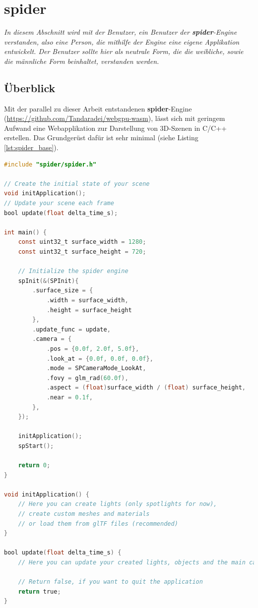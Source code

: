 \documentclass[oneside]{ausarbeitung}
\newcommand*{\quotize}[1]{\glqq #1\grqq}
\begin{document}
\section{spider}
\label{sec:spider}
\textit{In diesem Abschnitt wird mit \quotize{der Benutzer}, ein Benutzer der \textbf{spider}-Engine verstanden, also eine Person, die mithilfe der Engine eine eigene Applikation entwickelt. \quotize{Der Benutzer} sollte hier als neutrale Form, die die weibliche, sowie die männliche Form beinhaltet, verstanden werden.}
\subsection{Überblick}
\label{sub:overview}
Mit der parallel zu dieser Arbeit entstandenen \textbf{spider}-Engine (\url{https://github.com/Tandaradei/webgpu-wasm}), lässt sich mit geringem Aufwand eine Webapplikation zur Darstellung von 3D-Szenen in C/C++ erstellen.
Das Grundgerüst dafür ist sehr minimal (siehe Listing \ref{lst:spider_base}).

\begin{minipage}{\textwidth}
\begin{lstlisting}[language=C, label={lst:spider_base}, caption={Grundgerüst einer Applikation mit der \textbf{spider}-Engine}]
#include "spider/spider.h"

// Create the initial state of your scene
void initApplication();
// Update your scene each frame
bool update(float delta_time_s);

int main() {
	const uint32_t surface_width = 1280;
	const uint32_t surface_height = 720;

	// Initialize the spider engine
	spInit(&(SPInit){
		.surface_size = {
			.width = surface_width,
			.height = surface_height
		},
		.update_func = update,
		.camera = {
			.pos = {0.0f, 2.0f, 5.0f},
			.look_at = {0.0f, 0.0f, 0.0f},
			.mode = SPCameraMode_LookAt,
			.fovy = glm_rad(60.0f),
			.aspect = (float)surface_width / (float) surface_height,
			.near = 0.1f,
		},
	});	
	
	initApplication();
	spStart();
	
	return 0;
}

void initApplication() {
	// Here you can create lights (only spotlights for now),
	// create custom meshes and materials 
	// or load them from glTF files (recommended)
}

bool update(float delta_time_s) {
	// Here you can update your created lights, objects and the main camera
	
	// Return false, if you want to quit the application
	return true;
}
\end{lstlisting}
\end{minipage}
\end{document}
